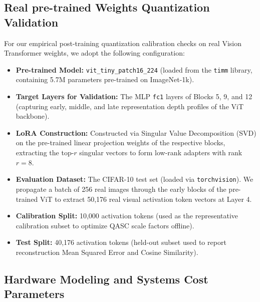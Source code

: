 \subsection{Real pre-trained Weights Quantization Validation}
\label{sec:appendix_pretrained_params}

For our empirical post-training quantization calibration checks on real Vision Transformer weights, we adopt the following configuration:
\begin{itemize}
    \item \textbf{Pre-trained Model:} \texttt{vit\_tiny\_patch16\_224} (loaded from the \texttt{timm} library, containing 5.7M parameters pre-trained on ImageNet-1k).
    \item \textbf{Target Layers for Validation:} The MLP \texttt{fc1} layers of Blocks 5, 9, and 12 (capturing early, middle, and late representation depth profiles of the ViT backbone).
    \item \textbf{LoRA Construction:} Constructed via Singular Value Decomposition (SVD) on the pre-trained linear projection weights of the respective blocks, extracting the top-$r$ singular vectors to form low-rank adapters with rank $r=8$.
    \item \textbf{Evaluation Dataset:} The CIFAR-10 test set (loaded via \texttt{torchvision}). We propagate a batch of 256 real images through the early blocks of the pre-trained ViT to extract 50,176 real visual activation token vectors at Layer 4.
    \item \textbf{Calibration Split:} 10,000 activation tokens (used as the representative calibration subset to optimize QASC scale factors offline).
    \item \textbf{Test Split:} 40,176 activation tokens (held-out subset used to report reconstruction Mean Squared Error and Cosine Similarity).
\end{itemize}

\subsection{Hardware Modeling and Systems Cost Parameters}
\label{sec:appendix_hardware_params}

